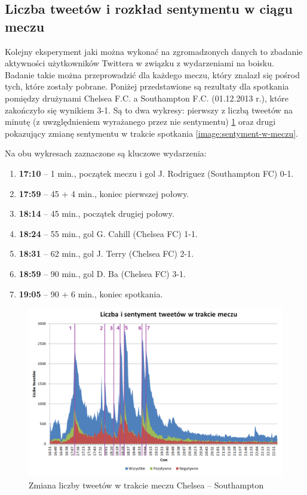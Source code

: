 \subsection{Liczba tweetów i rozkład sentymentu w ciągu meczu}
\label{subsection:aktywnoscwmeczu}
Kolejny eksperyment jaki można wykonać na zgromadzonych danych
to zbadanie aktywności użytkowników Twittera w związku z wydarzeniami 
na boisku. Badanie takie można przeprowadzić dla każdego meczu, który znalazł 
się pośrod tych, które zostały pobrane. Poniżej przedstawione są rezultaty
dla spotkania pomiędzy drużynami Chelsea F.C. a Southampton F.C. (01.12.2013 r.),
które zakończyło się wynikiem 3-1. Są to dwa wykresy: pierwszy z liczbą tweetów
na minutę (z uwzględnieniem wyrażanego przez nie sentymentu) 
\ref{image:tweety-w-meczu} oraz drugi pokazujący zmianę sentymentu w trakcie
spotkania \ref{image:sentyment-w-meczu}.

Na obu wykresach zaznaczone są kluczowe wydarzenia:

\begin{enumerate}
  \item \textbf{17:10} -- 1 min., początek meczu i gol J. Rodriguez (Southampton FC) 0-1.
  \item \textbf{17:59} -- 45 + 4 min., koniec pierwszej połowy.
  \item \textbf{18:14} -- 45 min., początek drugiej połowy.
  \item \textbf{18:24} -- 55 min., gol G. Cahill (Chelsea FC) 1-1.
  \item \textbf{18:31} -- 62 min., gol J. Terry (Chelsea FC) 2-1.
  \item \textbf{18:59} -- 90 min., gol D. Ba (Chelsea FC) 3-1.
  \item \textbf{19:05} -- 90 + 6 min., koniec spotkania.
\end{enumerate}



\begin{figure}[ht!]
\centering
\includegraphics[width=160mm]{img/tweety-w-meczu-nums.png}
\caption{Zmiana liczby tweetów w trakcie meczu Chelsea -- Southampton}
\label{image:tweety-w-meczu}
\end{figure}

